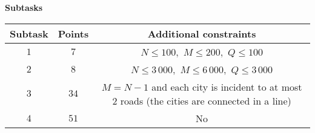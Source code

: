 \bf{Subtasks}

\begin{tabular}{|c|c|c|}\hline
\bf{Subtask}&\bf{Points}&\bf{Additional constraints}\\\hline
$1$&$7$&$N \le 100,$ $M \le 200,$ $Q \le 100$ \\\hline
$2$&$8$&$N \le 3\,000,$ $M \le 6\,000,$ $Q \le 3\,000$ \\\hline
$3$&$34$&$M=N-1$ and each city is incident to at most $2$ roads (the cities are connected in a line) \\\hline
$4$&$51$&No\\\hline
\end{tabular}

